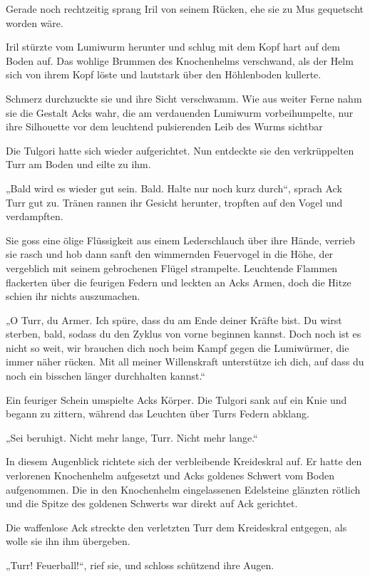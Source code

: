 Gerade noch rechtzeitig sprang Iril von seinem Rücken, ehe sie zu Mus gequetscht worden wäre.

Iril stürzte vom Lumiwurm herunter und schlug mit dem Kopf hart auf dem Boden auf. Das wohlige Brummen des Knochenhelms verschwand, als der Helm sich von ihrem Kopf löste und lautstark über den Höhlenboden kullerte.

Schmerz durchzuckte sie und ihre Sicht verschwamm. Wie aus weiter Ferne nahm sie die Gestalt Acks wahr, die am verdauenden Lumiwurm vorbeihumpelte, nur ihre Silhouette vor dem leuchtend pulsierenden Leib des Wurms sichtbar

Die Tulgori hatte sich wieder aufgerichtet. Nun entdeckte sie den verkrüppelten Turr am Boden und eilte zu ihm.

„Bald wird es wieder gut sein. Bald. Halte nur noch kurz durch“, sprach Ack Turr gut zu. Tränen rannen ihr Gesicht herunter, tropften auf den Vogel und verdampften.

Sie goss eine ölige Flüssigkeit aus einem Lederschlauch über ihre Hände, verrieb sie rasch und hob dann sanft den wimmernden Feuervogel in die Höhe, der vergeblich mit seinem gebrochenen Flügel strampelte. Leuchtende Flammen flackerten über die feurigen Federn und leckten an Acks Armen, doch die Hitze schien ihr nichts auszumachen.

„O Turr, du Armer. Ich spüre, dass du am Ende deiner Kräfte bist. Du wirst sterben, bald, sodass du den Zyklus von vorne beginnen kannst. Doch noch ist es nicht so weit, wir brauchen dich noch beim Kampf gegen die Lumiwürmer, die immer näher rücken. Mit all meiner Willenskraft unterstütze ich dich, auf dass du noch ein bisschen länger durchhalten kannst.“

Ein feuriger Schein umspielte Acks Körper. Die Tulgori sank auf ein Knie und begann zu zittern, während das Leuchten über Turrs Federn abklang.

„Sei beruhigt. Nicht mehr lange, Turr. Nicht mehr lange.“

In diesem Augenblick richtete sich der verbleibende Kreideskral auf. Er hatte den verlorenen Knochenhelm aufgesetzt und Acks goldenes Schwert vom Boden aufgenommen. Die in den Knochenhelm eingelassenen Edelsteine glänzten rötlich und die Spitze des goldenen Schwerts war direkt auf Ack gerichtet.

Die waffenlose Ack streckte den verletzten Turr dem Kreideskral entgegen, als wolle sie ihn ihm übergeben.

„Turr! Feuerball!“, rief sie, und schloss schützend ihre Augen.

